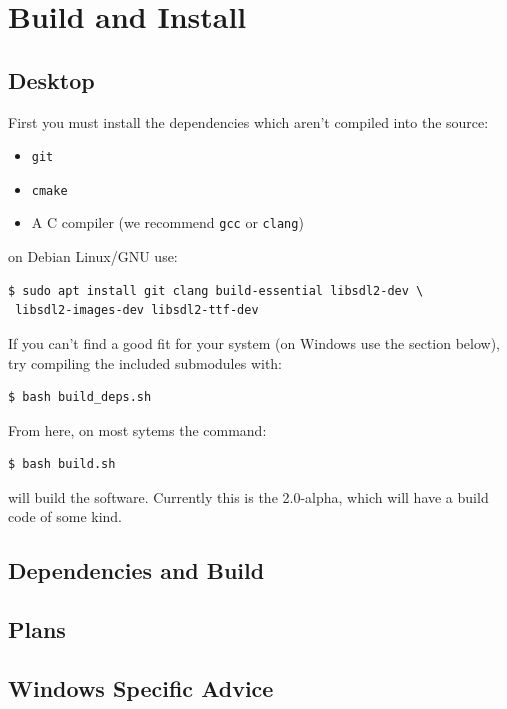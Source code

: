 \documentclass[11pt]{report}
\begin{document}
\section{Build and Install}

\subsection{Desktop}

First you must install the dependencies which aren't compiled into the source:

\begin{itemize}
\item \texttt{git}
\item \texttt{cmake}
\item A C compiler (we recommend \texttt{gcc} or \texttt{clang})
\end{itemize}

on Debian Linux/GNU use:

\begin{lstlisting}
$ sudo apt install git clang build-essential libsdl2-dev \
 libsdl2-images-dev libsdl2-ttf-dev
\end{lstlisting}

If you can't find a good fit for your system (on Windows use the section below),
try compiling the included submodules with:

\begin{lstlisting}
$ bash build_deps.sh
\end{lstlisting}

From here, on most sytems the command:

\begin{lstlisting}
$ bash build.sh
\end{lstlisting}

will build the software. Currently this is the 2.0-alpha, which will have a build code of
some kind.

\subsection{Dependencies and Build}

\subsection{Plans}

\subsection{Windows Specific Advice}
\end{document}
